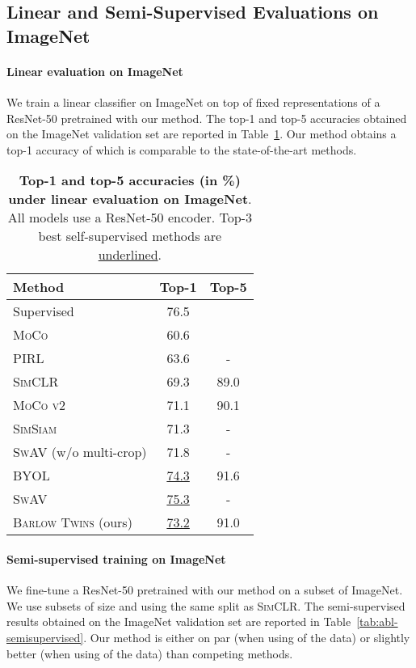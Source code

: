 \documentclass{article}
\newcommand{\AlgoName}{\textsc{Barlow Twins}}
\begin{document}
\subsection{Linear and Semi-Supervised Evaluations on ImageNet}

\paragraph{Linear evaluation on ImageNet}

We train a linear classifier on ImageNet on top of fixed representations of a ResNet-50 pretrained with our method. The top-1 and top-5 accuracies obtained on the ImageNet validation set are reported in Table~\ref{tab:abl-imagenet}. Our method obtains a top-1 accuracy of  which is comparable to the state-of-the-art methods.


\begin{table}[ht]
\caption{\textbf{Top-1 and top-5 accuracies (in \%) under linear evaluation on ImageNet}. All models use a ResNet-50 encoder. Top-3 best self-supervised methods are \underline{underlined}.} \label{tab:abl-imagenet}
\vskip 0.15in
\begin{center}
\begin{tabular}{lcc}
\toprule
Method  &  Top-1 & Top-5 \\
\midrule
Supervised & 76.5 & \\
\midrule
\textsc{MoCo}    & 60.6 & \\
\textsc{PIRL} & 63.6 & - \\
\textsc{SimCLR} & 69.3  & 89.0 \\
\textsc{MoCo v2} & 71.1 & 90.1 \\
\textsc{SimSiam} & 71.3 & - \\
\textsc{SwAV} (w/o multi-crop) & 71.8 & - \\
\textsc{BYOL} & \underline{74.3} & 91.6  \\
\textsc{SwAV} & \underline{75.3} & - \\
\AlgoName{} (ours) & \underline{73.2} & 91.0 \\
\bottomrule
\end{tabular}
\end{center}
\vskip -0.1in
\end{table}

\paragraph{Semi-supervised training on ImageNet}
We fine-tune a ResNet-50 pretrained with our method on a subset of ImageNet. We use subsets of size  and  using the same split as \textsc{SimCLR}. The semi-supervised results obtained on the ImageNet validation set are reported in Table~\ref{tab:abl-semisupervised}. Our method is either on par (when using  of the data) or slightly better (when using  of the data) than competing methods.
\end{document}
